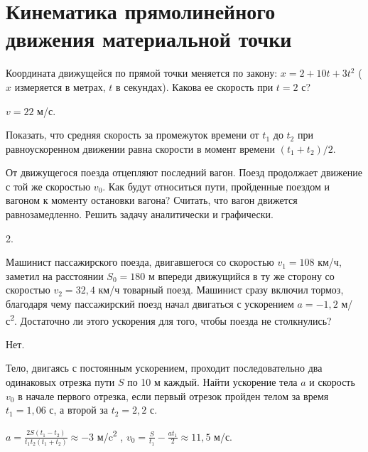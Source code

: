 \section{Кинематика прямолинейного движения материальной точки}

\begin{ex} %
Координата движущейся по прямой точки меняется по закону: $x = 2 + 10t + 3t^2$ ($x$ измеряется в метрах, $t$ в секундах). Какова ее скорость при $t = 2$ с?
\begin{ans}
$v = 22$ м/с.
\end{ans}
\end{ex}

\begin{ex} %
Показать, что средняя скорость за промежуток времени от $t_1$ до $t_2$ при равноускоренном движении равна скорости в момент времени $(t_1 + t_2)/2$.
\begin{ans}
\end{ans}
\end{ex}

\begin{ex} %
От движущегося поезда отцепляют последний вагон. Поезд продолжает движение с той же скоростью $v_0$. Как будут относиться пути, пройденные поездом и вагоном к моменту остановки вагона? Считать, что вагон движется равнозамедленно. Решить задачу аналитически и графически.
\begin{ans}
2.
\end{ans}
\end{ex}

\begin{ex} %
Машинист пассажирского поезда, двигавшегося со скоростью $v_1 = 108$ км/ч, заметил на расстоянии $S_0 = 180$ м впереди движущийся в ту же сторону со скоростью $v_2 = 32,4$ км/ч товарный поезд. Машинист сразу включил тормоз, благодаря чему пассажирский поезд начал двигаться с ускорением $a = -1,2$ м/с\textsuperscript{2}. Достаточно ли этого ускорения для того, чтобы поезда не столкнулись?
\begin{ans}
Нет.
\end{ans}
\end{ex}

\begin{ex} %
Тело, двигаясь с постоянным ускорением, проходит последовательно два одинаковых отрезка пути $S$ по 10 м каждый. Найти ускорение тела $a$ и скорость $v_0$ в начале первого отрезка, если первый отрезок пройден телом за время $t_1 = 1,06$ с, а второй за $t_2 = 2,2$ с.
\begin{ans}
$a = \frac{2S\left(t_1-t_2\right)}{t_1t_2\left(t_1+t_2\right)} \approx -3$ м/c\textsuperscript{2} , $v_0 = \frac{S}{t_1}-\frac{at_1}{2} \approx 11,5$ м/с.
\end{ans}
\end{ex}

